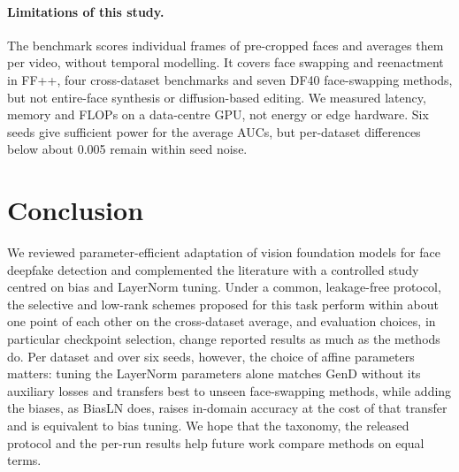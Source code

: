 \documentclass[fonts]{icst}
\begin{document}
\paragraph{Limitations of this study.} The benchmark scores individual frames of pre-cropped faces and averages them per video, without temporal modelling. It covers face swapping and reenactment in FF++, four cross-dataset benchmarks and seven DF40 face-swapping methods, but not entire-face synthesis or diffusion-based editing. We measured latency, memory and FLOPs on a data-centre GPU, not energy or edge hardware. Six seeds give sufficient power for the average AUCs, but per-dataset differences below about 0.005 remain within seed noise.

\section{Conclusion}
We reviewed parameter-efficient adaptation of vision foundation models for face deepfake detection and complemented the literature with a controlled study centred on bias and LayerNorm tuning. Under a common, leakage-free protocol, the selective and low-rank schemes proposed for this task perform within about one point of each other on the cross-dataset average, and evaluation choices, in particular checkpoint selection, change reported results as much as the methods do. Per dataset and over six seeds, however, the choice of affine parameters matters: tuning the LayerNorm parameters alone matches GenD without its auxiliary losses and transfers best to unseen face-swapping methods, while adding the biases, as BiasLN does, raises in-domain accuracy at the cost of that transfer and is equivalent to bias tuning. We hope that the taxonomy, the released protocol and the per-run results help future work compare methods on equal terms.
\end{document}

